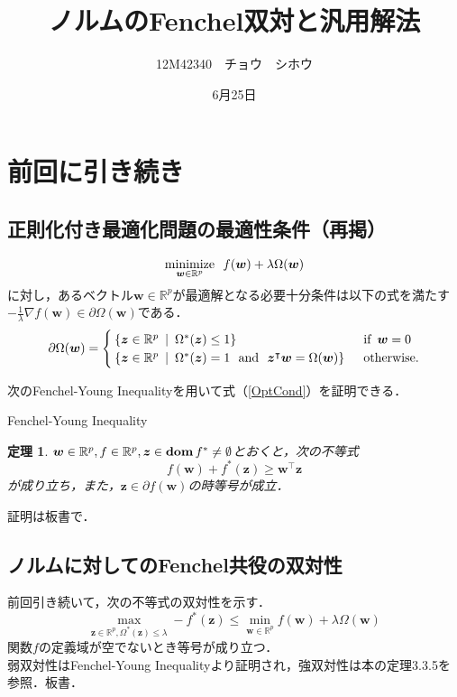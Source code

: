 \documentclass[a4paper,11pt]{jsarticle}
\title{ノルムのFenchel双対と汎用解法}
\author{12M42340　チョウ　シホウ}
\date{6月25日}
\newtheorem{theorem}{定理}
\numberwithin{theorem}{section}  %
\numberwithin{equation}{section} %
\newcommand{\dom}{\mathop{\mathrm{\bf dom}}\nolimits}
\newcommand{\minimize}{\mathop{\mathrm{\rm minimize}}\limits}
\begin{document}
{}
\renewcommand{\thepart}{\arabic{part}}

\section{前回に引き続き}
\subsection{正則化付き最適化問題の最適性条件（再掲）}
\begin{equation}
\minimize_{\bm{w} \in \mathbb{R}^p}\,\,\, f(\bm{w}) + \lambda \Omega(\bm{w}) \label{PP}
\end{equation}
に対し，あるベクトル$\bm{w} \in \mathbb{R}^p$が最適解となる必要十分条件は以下の式を満たす$-\frac{1}{\lambda} \nabla f(\bm{w}) \in \partial \Omega(\bm{w})$である．
\begin{equation}
\partial \Omega(\bm{w}) = \begin{cases}
\{ \bm{z} \in \mathbb{R}^p \,\,\,|\,\,\, \Omega^*(\bm{z}) \le 1 \} & \text{\,\,\,if\,\,\,} \bm{w} = 0 \\
\{ \bm{z} \in \mathbb{R}^p \,\,\,|\,\,\, \Omega^*(\bm{z}) = 1 \text{\,\,\,\,and\,\,\,\,} \bm{z}^\intercal \bm{w} = \Omega(\bm{w}) \}  & \text{\,\,\,otherwise.}
\end{cases}
\label{OptCond}
\end{equation}

次のFenchel-Young Inequalityを用いて式（\ref{OptCond}）を証明できる．
\begin{itembox}[l]{Fenchel-Young Inequality}
\begin{theorem}
$\bm{w} \in \mathbb{R}^p,f \in \mathbb{R}^p,\bm{z} \in \dom f^* \neq \emptyset$とおくと，次の不等式
\[
f(\bm{w}) + f^*(\bm{z}) \ge \bm{w}^\intercal \bm{z}
\]が成り立ち，また，$\bm{z} \in \partial f(\bm{w})$の時等号が成立．
\end{theorem}
\end{itembox}
証明は板書で．

\subsection{ノルムに対してのFenchel共役の双対性}
前回引き続いて，次の不等式の双対性を示す．
\begin{equation}
\max_{\bm{z} \in \mathbb{R}^p,\Omega^*(\bm{z}) \le \lambda} -f^*(\bm{z}) \le \min_{\bm{w}\in \mathbb{R}^p} f(\bm{w}) + \lambda \Omega(\bm{w})
\end{equation}
関数$f$の定義域が空でないとき等号が成り立つ．\\
弱双対性はFenchel-Young Inequalityより証明され，強双対性は本\cite{borwein}の定理3.3.5を参照．板書．
\end{document}
